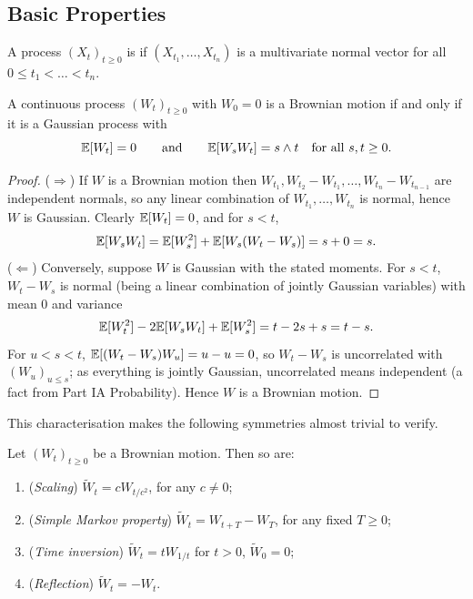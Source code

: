 \documentclass[a4paper]{scrartcl}
\begin{document}
\subsection{Basic Properties}

\begin{definition}
	A process $(X_t)_{t\geq0}$ is  if $(X_{t_1},\dots,X_{t_n})$ is a multivariate normal vector for all $0\leq t_1<\dots<t_n$.
\end{definition}

\begin{theorem}\label{thm:bm-gaussian}
	A continuous process $(W_t)_{t\geq0}$ with $W_0 = 0$ is a Brownian motion if and only if it is a Gaussian process with
	$$
	\mathbb{E}[W_t] = 0 \qquad\text{and}\qquad \mathbb{E}[W_sW_t] = s\wedge t \quad \text{for all } s,t\geq0.
	$$
\end{theorem}

\begin{proof}
	($\Rightarrow$) If $W$ is a Brownian motion then $W_{t_1}, W_{t_2}-W_{t_1},\dots,W_{t_n}-W_{t_{n-1}}$ are independent normals, so any linear combination of $W_{t_1},\dots,W_{t_n}$ is normal, hence $W$ is Gaussian. Clearly $\mathbb{E}[W_t]=0$, and for $s<t$,
	$$
	\mathbb{E}[W_sW_t] = \mathbb{E}[W_s^2] + \mathbb{E}[W_s(W_t-W_s)] = s + 0 = s.
	$$
	($\Leftarrow$) Conversely, suppose $W$ is Gaussian with the stated moments. For $s<t$, $W_t - W_s$ is normal (being a linear combination of jointly Gaussian variables) with mean $0$ and variance
	$$
	\mathbb{E}[W_t^2] - 2\mathbb{E}[W_sW_t] + \mathbb{E}[W_s^2] = t - 2s + s = t-s.
	$$
	For $u < s < t$, $\mathbb{E}[(W_t-W_s)W_u] = u - u = 0$, so $W_t - W_s$ is uncorrelated with $(W_u)_{u\leq s}$; as everything is jointly Gaussian, uncorrelated means independent (a fact from Part IA Probability). Hence $W$ is a Brownian motion.
\end{proof}

This characterisation makes the following symmetries almost trivial to verify.

\begin{theorem}
	Let $(W_t)_{t\geq0}$ be a Brownian motion. Then so are:
	\begin{enumerate}[label=(\roman*)]
		\item (\emph{Scaling}) $\tilde W_t = cW_{t/c^2}$, for any $c \neq 0$;
		\item (\emph{Simple Markov property}) $\tilde W_t = W_{t+T}-W_T$, for any fixed $T \geq 0$;
		\item (\emph{Time inversion}) $\tilde W_t = tW_{1/t}$ for $t>0$, $\tilde W_0 = 0$;
		\item (\emph{Reflection}) $\tilde W_t = -W_t$.
	\end{enumerate}
\end{theorem}
\end{document}

